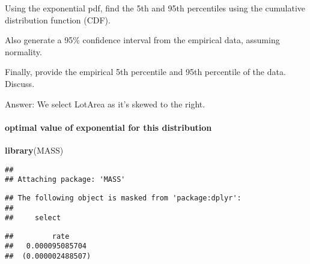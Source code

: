 \documentclass[]{article}
\newenvironment{Shaded}{\begin{snugshade}}{\end{snugshade}}
\newcommand{\CommentTok}[1]{\textcolor[rgb]{0.56,0.35,0.01}{\textit{#1}}}
\newcommand{\KeywordTok}[1]{\textcolor[rgb]{0.13,0.29,0.53}{\textbf{#1}}}
\newcommand{\NormalTok}[1]{#1}
\newcommand{\OperatorTok}[1]{\textcolor[rgb]{0.81,0.36,0.00}{\textbf{#1}}}
\newcommand{\StringTok}[1]{\textcolor[rgb]{0.31,0.60,0.02}{#1}}
\let\oldparagraph\paragraph
\renewcommand{\paragraph}[1]{\oldparagraph{#1}\mbox{}}
\begin{document}
Using the exponential pdf, find the 5th and 95th percentiles using the
cumulative distribution function (CDF).

Also generate a 95\% confidence interval from the empirical data,
assuming normality.

Finally, provide the empirical 5th percentile and 95th percentile of the
data. Discuss.

Answer: We select LotArea as it's skewed to the right.

\hypertarget{optimal-value-of-exponential-for-this-distribution}{%
\paragraph{optimal value of exponential for this
distribution}\label{optimal-value-of-exponential-for-this-distribution}}

\begin{Shaded}
\begin{Highlighting}[]
\KeywordTok{library}\NormalTok{(MASS)}
\end{Highlighting}
\end{Shaded}

\begin{verbatim}
## 
## Attaching package: 'MASS'
\end{verbatim}

\begin{verbatim}
## The following object is masked from 'package:dplyr':
## 
##     select
\end{verbatim}

\begin{Shaded}
\end{Shaded}

\begin{verbatim}
##         rate     
##   0.000095085704 
##  (0.000002488507)
\end{verbatim}

\begin{Shaded}
\end{Shaded}
\end{document}
